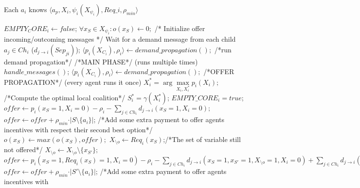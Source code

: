 \documentclass{article}
\begin{document}
\begin{algorithm}[!tb]
\caption{\textbf{SCF\_Graphs}} 
\small
Each $a_i$ knows $\langle a_p,  X_i,\psi_i(X_{\psi_i}),Req\_i,\rho_{min}
\rangle$ \begin{algorithmic}[1]
 \STATE $EMPTY_CORE_i\leftarrow false$;
 \STATE $\forall{x_S \in X_{\psi_i}}: o(x_S)\leftarrow 0;$ /*
 Initialize offer incoming/outcoming messages */ 
 \STATE Wait for a demand message from each child $a_j\in Ch_i$ ($d_{j
        \rightarrow i}(Sep_{ji})$);
 \STATE $\langle p_i(X_{C_i}), \rho_i \rangle \leftarrow
     demand\_propagation();$ /*run demand propagation*/
 \STATE /*MAIN PHASE*/ (runs multiple times)
 \STATE $handle\_messages()$; 
 \STATE $\langle p_i(X_{C_i}), \rho_i \rangle \leftarrow demand\_propagation();$
 \ENDWHILE
 \STATE /*OFFER PROPAGATION*/ (every agent runs it once)
 \STATE $X^*_{i} = \arg \max\limits_{X_{i}, X^{*}_i} p_i(X_{i});$ /*Compute the optimal local coalition*/
 \STATE $S^*_i=\gamma(X^*_{i})$;
 	\STATE $EMPTY\_CORE_i=true$;
 \ENDIF  
  		\STATE $offer \leftarrow p_i(x_S=1,X_{i}=0) -\rho_i
  		-\sum\limits_{j\in Ch_i} d_{j\rightarrow i}(x_S=1, X_{i}=0);$
  			\STATE $offer \leftarrow offer + \rho_{min}\cdot \vert S\setminus
  			\{a_i\}\vert $; /*Add some extra payment to offer agents incentives with
  			respect their second best option*/
  		\ENDIF 
  		\STATE $o(x_{S})\leftarrow max(o(x_{S}),offer);$
  	\ELSE
	    \STATE $X_{\setminus o} \leftarrow Req_i(x_S)$;/*The set of variable
	    still not offered*/ 
	    	\STATE $X_{\setminus o} \leftarrow X_{\setminus o} \setminus \{x_{S'}\}; $
	  		\STATE $offer \leftarrow p_i(x_S=1,Req_i(x_S)=1,X_{i}=0) -\rho_i
	  		-\sum\limits_{j\in Ch_i} d_{j\rightarrow i}(x_S=1, x_{S'}=1, X_{\setminus o} = 1,X_{i}=0) +\sum\limits_{j\in Ch_i}
	  	d_{j\rightarrow i}(x_S=0, x_{S'}=0, X_{\setminus o} = 1,X_{i}=0);$
	  			\STATE $offer \leftarrow offer + \rho_{min}\cdot \vert S'\setminus
	  			\{a_i\}\vert $; /*Add some extra payment to offer agents incentives with

\end{algorithmic}
\end{algorithm}
\end{document}
